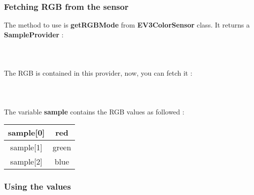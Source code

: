 \documentclass[a4paper, 12pt]{article}
\begin{document}
\subsubsection{Fetching RGB from the sensor}

The method to use is \textbf{getRGBMode} from \textbf{EV3ColorSensor} class. It returns a \textbf{SampleProvider} :
\\ \\
\\ \\
The RGB is contained in this provider, now, you can fetch it :
\\ \\
\\ \\
The variable \textbf{sample} contains the RGB values as followed :
\begin{center}
\begin{tabular}{|c|c|}
\hline 
sample[0] & red \\ 
\hline 
sample[1] & green \\ 
\hline 
sample[2] & blue \\ 
\hline 
\end{tabular}
\end{center}

\subsubsection{Using the values}
\end{document}
